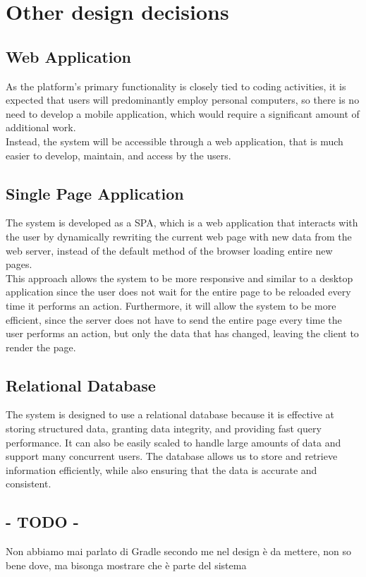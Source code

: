 \section{Other design decisions}
\subsection{Web Application}
As the platform's primary functionality is closely tied to coding activities, it is expected that users will predominantly employ personal computers, so there is no need to develop a mobile application, which would require a significant amount of additional work. \\
Instead, the system will be accessible through a web application, that is much easier to develop, maintain, and access by the users.

\subsection{Single Page Application}
The system is developed as a SPA, which is a web application that interacts with the user by dynamically rewriting the current web page with new data from the web server, instead of the default method of the browser loading entire new pages.\\
This approach allows the system to be more responsive and similar to a desktop application since the user does not wait for the entire page to be reloaded every time it performs an action. 
Furthermore, it will allow the system to be more efficient, since the server does not have to send the entire page every time the user performs an action, but only the data that has changed, leaving the client to render the page.

\subsection{Relational Database}
The system is designed to use a relational database because it is effective at storing structured data, granting data integrity, and providing fast query performance. 
It can also be easily scaled to handle large amounts of data and support many concurrent users. 
The database allows us to store and retrieve information efficiently, while also ensuring that the data is accurate and consistent.

\subsection{- TODO -}
{\color{red}Non abbiamo mai parlato di Gradle secondo me nel design è da mettere, non so bene dove, ma bisonga mostrare che è parte del sistema \\}